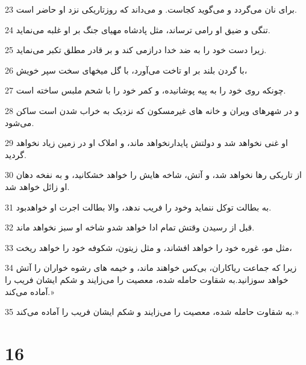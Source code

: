 \par 23 برای نان می‌گردد و می‌گوید کجاست. و می‌داند که روزتاریکی نزد او حاضر است.
\par 24 تنگی و ضیق او رامی ترساند، مثل پادشاه مهیای جنگ بر او غلبه می‌نماید.
\par 25 زیرا دست خود را به ضد خدا درازمی کند و بر قادر مطلق تکبر می‌نماید.
\par 26 با گردن بلند بر او تاخت می‌آورد، با گل میخهای سخت سپر خویش،
\par 27 چونکه روی خود را به پیه پوشانیده، و کمر خود را با شحم ملبس ساخته است.
\par 28 و در شهرهای ویران و خانه های غیرمسکون که نزدیک به خراب شدن است ساکن می‌شود.
\par 29 او غنی نخواهد شد و دولتش پایدارنخواهد ماند، و املاک او در زمین زیاد نخواهد گردید.
\par 30 از تاریکی رها نخواهد شد، و آتش، شاخه هایش را خواهد خشکانید، و به نفخه دهان او زائل خواهد شد.
\par 31 به بطالت توکل ننماید وخود را فریب ندهد، والا بطالت اجرت او خواهدبود.
\par 32 قبل از رسیدن وقتش تمام ادا خواهد شدو شاخه او سبز نخواهد ماند.
\par 33 مثل مو، غوره خود را خواهد افشاند، و مثل زیتون، شکوفه خود را خواهد ریخت،
\par 34 زیرا که جماعت ریاکاران، بی‌کس خواهند ماند، و خیمه های رشوه خواران را آتش خواهد سوزانید.به شقاوت حامله شده، معصیت را می‌زایند و شکم ایشان فریب را آماده می‌کند.»
\par 35 به شقاوت حامله شده، معصیت را می‌زایند و شکم ایشان فریب را آماده می‌کند.»
 
\chapter{16}

